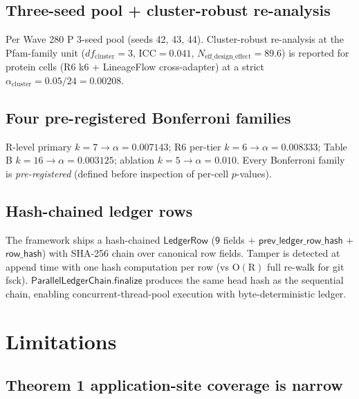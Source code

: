 \documentclass[journal,twocolumn,final]{IEEEtran}
\begin{document}
\subsection{Three-seed pool + cluster-robust re-analysis}

Per Wave 280 P 3-seed pool (seeds 42, 43, 44). Cluster-robust re-analysis at
the Pfam-family unit ($df_\mathrm{cluster} = 3$, $\mathrm{ICC} = 0.041$,
$N_\mathrm{eff\_design\_effect} = 89.6$) is reported for protein cells (R6 k6
+ LineageFlow cross-adapter) at a strict $\alpha_\mathrm{cluster} = 0.05/24 =
0.00208$.

\subsection{Four pre-registered Bonferroni families}

R-level primary $k=7 \to \alpha = 0.007143$; R6 per-tier $k=6 \to \alpha =
0.008333$; Table B $k=16 \to \alpha = 0.003125$; ablation $k=5 \to \alpha =
0.010$. Every Bonferroni family is \emph{pre-registered} (defined before
inspection of per-cell $p$-values).

\subsection{Hash-chained ledger rows}

The framework ships a hash-chained $\mathsf{LedgerRow}$ ($\mathsf{9}$ fields +
$\mathsf{prev\_ledger\_row\_hash}$ + $\mathsf{row\_hash}$) with SHA-256 chain
over canonical row fields. Tamper is detected at append time with one hash
computation per row (vs $\mathrm{O}(\mathrm{R})$ full re-walk for git fsck).
$\mathsf{ParallelLedgerChain.finalize}$ produces the same head hash as the
sequential chain, enabling concurrent-thread-pool execution with
byte-deterministic ledger.

\section{Limitations}\label{sec:limitations}

\subsection*{Theorem 1 application-site coverage is narrow}
\end{document}
